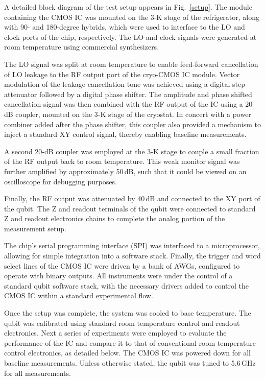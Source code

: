\documentclass[journal]{IEEEtran}
\newcommand{\CR}[1]{{\color{black}#1}}
\begin{document}
A detailed block diagram of the test setup appears in Fig.~\ref{setup}. The module containing the CMOS IC was mounted on the 3-K stage of the refrigerator, along with 90- and 180-degree hybrids, which were used to interface to the LO and clock ports of the chip, respectively. The LO and clock signals were generated at room temperature using commercial synthesizers. 

The LO signal was split at room temperature to enable feed-forward cancellation of LO leakage to the RF output port of the cryo-CMOS IC module. Vector modulation of the leakage cancellation tone was achieved using a digital step attenuator followed by a digital phase shifter. The amplitude and phase shifted cancellation signal was then combined with the RF output of the IC using a 20-dB coupler, mounted on the 3-K stage of the cryostat.  In concert with a power combiner added after the phase shifter, this coupler also provided a mechanism to inject a standard XY control signal, thereby enabling baseline measurements.

A second 20-dB coupler was employed at the 3-K stage to couple a small fraction of the RF output back to room temperature. This weak monitor signal was further amplified by approximately 50\,dB, such that it could be viewed on an oscilloscope for debugging purposes. 

Finally, the RF output was attenuated by 40\,dB and connected to the XY port of the qubit. The Z and readout terminals of the qubit were connected to standard Z and readout electronics chains to complete the analog portion of the measurement setup. 

The \CR{chip's serial programming interface (SPI)} was interfaced to a microprocessor, allowing for simple integration into a software stack. Finally, the trigger and word select lines of the CMOS IC were driven by a bank of AWGs, configured to operate with binary outputs. All instruments were under the control of a standard qubit software stack, with the necessary drivers added to control the CMOS IC within a standard experimental flow. 

Once the setup was complete, the system was cooled to base temperature. The qubit was calibrated using  standard room temperature control and readout electronics.  Next a series of experiments were employed to evaluate the performance of the IC and compare it to that of conventional room temperature control electronics, as detailed below. The CMOS IC was powered down for all baseline measurements. Unless otherwise stated,  the qubit was tuned to 5.6\,GHz for all measurements. 
\end{document}
